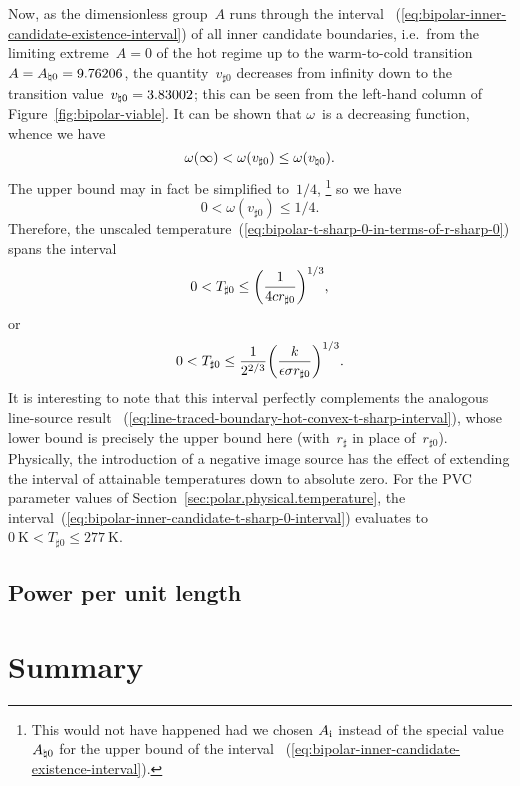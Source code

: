 Now, as the dimensionless group~$A$
runs through the interval~%
  (\ref{eq:bipolar-inner-candidate-existence-interval})
of all inner candidate boundaries,
i.e.~from the limiting extreme~$A = 0$ of the hot regime
up to the warm-to-cold transition~$A = A_{\natural 0} = 9.76206$,
the quantity~$v_{\sharp 0}$ decreases from infinity
down to the transition value~$v_{\natural 0} = 3.83002$;
this can be seen from the left-hand column
of Figure~\ref{fig:bipolar-viable}.
It can be shown that $\omega$~is a decreasing function,
whence we have
\begin{equation}
  \omega (\infty) < \omega (v_{\sharp 0}) \le \omega (v_{\natural 0}).
  \label{eq:bipolar-inner-candidate-omega-interval}
\end{equation}
The upper bound may in fact be simplified to~$1/4$,%
\footnote{
  This would not have happened
  had we chosen $A_{\mathrm{i}}$ instead of the special value~$A_{\natural 0}$
  for the upper bound of the interval~%
  (\ref{eq:bipolar-inner-candidate-existence-interval}).
}
so we have
\begin{equation}
  0 < \omega (v_{\sharp 0}) \le 1/4.
  \label{eq:bipolar-inner-candidate-omega-interval-evaluated}
\end{equation}
Therefore,
the unscaled temperature~(\ref{eq:bipolar-t-sharp-0-in-terms-of-r-sharp-0})
spans the interval
\[
  0
    <
  T_{\sharp 0}
    \le
  \roundbr*{\frac{1}{4 c r_{\sharp 0}}}^{1/3},
\]
or
\begin{equation}
  0
    <
  T_{\sharp 0}
    \le
  \frac{1}{2^{2/3}}
  \roundbr*{\frac{\conduc}{\emiss \stefan r_{\sharp 0}}}^{1/3}.
  \label{eq:bipolar-inner-candidate-t-sharp-0-interval}
\end{equation}
It is interesting to note that this interval
perfectly complements the analogous line-source result~%
  (\ref{eq:line-traced-boundary-hot-convex-t-sharp-interval}),
whose lower bound is precisely the upper bound here
(with~$r_\sharp$ in place of~$r_{\sharp 0}$).
Physically, the introduction of a negative image source
has the effect of extending the interval of attainable temperatures
down to absolute zero.
For the PVC parameter values
of Section~\ref{sec:polar.physical.temperature},
the interval~(\ref{eq:bipolar-inner-candidate-t-sharp-0-interval})
evaluates to $\SI{0}{\kelvin} < T_{\sharp 0} \le \SI{277}{\kelvin}$.

\subsection{Power per unit length}
\label{sec:bipolar.physical.power}


\section{Summary}
\label{sec:bipolar.summary}


